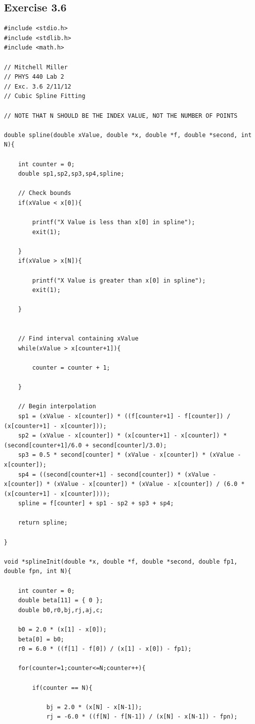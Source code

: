 \documentclass[12pt]{article}
\begin{document}
\subsection{Exercise 3.6}
\begin{verbatim}
#include <stdio.h>
#include <stdlib.h>
#include <math.h>

// Mitchell Miller
// PHYS 440 Lab 2
// Exc. 3.6 2/11/12
// Cubic Spline Fitting

// NOTE THAT N SHOULD BE THE INDEX VALUE, NOT THE NUMBER OF POINTS

double spline(double xValue, double *x, double *f, double *second, int N){

	int counter = 0;
	double sp1,sp2,sp3,sp4,spline;	
	
	// Check bounds
	if(xValue < x[0]){

		printf("X Value is less than x[0] in spline");
		exit(1);
	
	}
	if(xValue > x[N]){

		printf("X Value is greater than x[0] in spline");
		exit(1);

	}


	// Find interval containing xValue
	while(xValue > x[counter+1]){

		counter = counter + 1;

	}

	// Begin interpolation
	sp1 = (xValue - x[counter]) * ((f[counter+1] - f[counter]) / (x[counter+1] - x[counter]));
	sp2 = (xValue - x[counter]) * (x[counter+1] - x[counter]) * (second[counter+1]/6.0 + second[counter]/3.0);
	sp3 = 0.5 * second[counter] * (xValue - x[counter]) * (xValue - x[counter]);
	sp4 = ((second[counter+1] - second[counter]) * (xValue - x[counter]) * (xValue - x[counter]) * (xValue - x[counter]) / (6.0 * (x[counter+1] - x[counter])));
	spline = f[counter] + sp1 - sp2 + sp3 + sp4;

	return spline;

}

void *splineInit(double *x, double *f, double *second, double fp1, double fpn, int N){

	int counter = 0;
	double beta[11] = { 0 };
	double b0,r0,bj,rj,aj,c;
	
	b0 = 2.0 * (x[1] - x[0]);
	beta[0] = b0;
	r0 = 6.0 * ((f[1] - f[0]) / (x[1] - x[0]) - fp1);

	for(counter=1;counter<=N;counter++){

		if(counter == N){

			bj = 2.0 * (x[N] - x[N-1]);
			rj = -6.0 * ((f[N] - f[N-1]) / (x[N] - x[N-1]) - fpn);


\end{verbatim}
\end{document}
